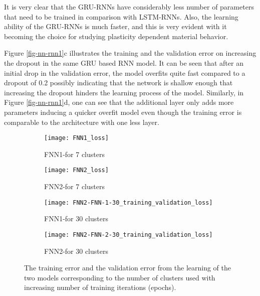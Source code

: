 It is very clear that the GRU-RNNs have considerably less number of parameters that need to be trained in comparison with LSTM-RNNs. Also, the learning ability of the GRU-RNNs is much faster, and this is very evident with it becoming the choice for studying plasticity dependent material behavior\cite{mozaffarDeepLearningPredicts2019,gorjiPotentialRecurrentNeural2020}.

Figure \ref{fig-nn-rnn1}c illustrates the training and the validation error on increasing the dropout in the same GRU based RNN model. It can be seen that after an initial drop in the validation error, the model overfits quite fast compared to a dropout of 0.2 possibly indicating that the network is shallow enough that increasing the dropout hinders the learning process of the model. Similarly, in Figure \ref{fig-nn-rnn1}d, one can see that the additional layer only adds more parameters inducing a quicker overfit model even though the training error is comparable to the architecture with one less layer. 

\begin{figure}[]
	\centering
	\begin{subfigure}[t]{0.49\textwidth}
		\texttt{[image: FNN1\_loss]}
		\caption{FNN1-\fnn for 7 clusters}
	\end{subfigure}
	\begin{subfigure}[t]{0.49\textwidth}
		\texttt{[image: FNN2\_loss]}
		\caption{FNN2-\fnn for 7 clusters}
	\end{subfigure}
	\begin{subfigure}[t]{0.49\textwidth}
		\texttt{[image: FNN2-FNN-1-30\_training\_validation\_loss]}
		\caption{FNN1-\fnn for 30 clusters}
	\end{subfigure}
	\begin{subfigure}[t]{0.49\textwidth}
		\texttt{[image: FNN2-FNN-2-30\_training\_validation\_loss]}
		\caption{FNN2-\fnn for 30 clusters}
	\end{subfigure}
	\caption{The training error and the validation error from the learning of the two \fnn models corresponding to the number of clusters used with increasing number of training iterations (epochs).}\label{fig-nn-rnn2}
\end{figure}


